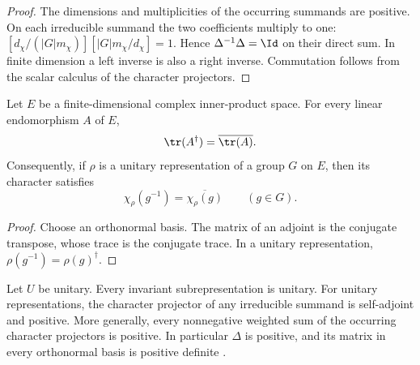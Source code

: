\begin{proof}\leanok
    The dimensions and multiplicities of the occurring summands are
    positive. On each irreducible summand the two coefficients multiply
    to one:
    $[d_\chi/(|G|m_\chi)][|G|m_\chi/d_\chi]=1$.
    Hence $\Delta^{-1}\Delta=\Id$ on their direct sum. In finite dimension
    a left inverse is also a right inverse. Commutation follows from
    the scalar calculus of the character projectors.
\end{proof}

\begin{lemma}
    \label{thm:peps_unitary_character_adjoint}
    \leanok
    Let $E$ be a finite-dimensional complex inner-product space. For every
    linear endomorphism $A$ of $E$,
    \[
        \tr(A^\dagger)=\overline{\tr(A)}.
    \]
    Consequently, if $\rho$ is a unitary representation of a group $G$ on $E$,
    then its character satisfies
    \[
        \chi_\rho(g^{-1})=\overline{\chi_\rho(g)}\qquad(g\in G).
    \]
\end{lemma}

\begin{proof}\leanok
    Choose an orthonormal basis. The matrix of an adjoint is the conjugate
    transpose, whose trace is the conjugate trace. In a unitary representation,
    $\rho(g^{-1})=\rho(g)^\dagger$.
\end{proof}

\begin{lemma}
    \label{thm:peps_delta_positive}
    \leanok
    Let $U$ be unitary. Every invariant subrepresentation is unitary. For
    unitary representations, the character projector of any irreducible
    summand is self-adjoint and positive. More generally, every nonnegative
    weighted sum of the occurring character projectors is positive. In
    particular $\Delta$ is positive, and its matrix in every orthonormal basis
    is positive definite \cite[Lemma~4.4]{Schuch2010PEPS}.
\end{lemma}


